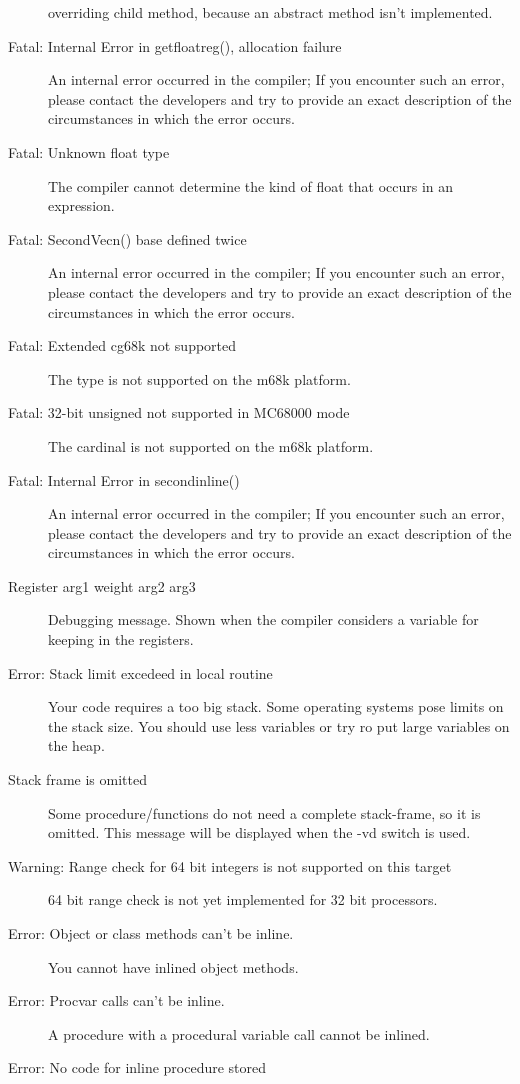 \begin{description}
 overriding child method, because an abstract method isn't implemented.
\item [Fatal: Internal Error in getfloatreg(), allocation failure]
 An internal error occurred in the compiler; If you encounter such an error,
 please contact the developers and try to provide  an exact description of
 the circumstances in which the error occurs.
\item [Fatal: Unknown float type]
 The compiler cannot determine the kind of float that occurs in an expression.
\item [Fatal: SecondVecn() base defined twice]
 An internal error occurred in the compiler; If you encounter such an error,
 please contact the developers and try to provide  an exact description of
 the circumstances in which the error occurs.
\item [Fatal: Extended cg68k not supported]
 The  type is not supported on the m68k platform.
\item [Fatal: 32-bit unsigned not supported in MC68000 mode]
 The cardinal is not supported on the m68k platform.
\item [Fatal: Internal Error in secondinline()]
 An internal error occurred in the compiler; If you encounter such an error,
 please contact the developers and try to provide  an exact description of
 the circumstances in which the error occurs.
\item [Register arg1 weight arg2 arg3]
 Debugging message. Shown when the compiler considers a variable for
 keeping in the registers.
\item [Error: Stack limit excedeed in local routine]
 Your code requires a too big stack. Some operating systems pose limits
 on the stack size. You should use less variables or try ro put large
 variables on the heap.
\item [Stack frame is omitted]
 Some procedure/functions do not need a complete stack-frame, so it is omitted.
 This message will be displayed when the {-vd} switch is used.
\item [Warning: Range check for 64 bit integers is not supported on this target]
 64 bit range check is not yet implemented for 32 bit processors.
\item [Error: Object or class methods can't be inline.]
 You cannot have inlined object methods.
\item [Error: Procvar calls can't be inline.]
 A procedure with a procedural variable call cannot be inlined.
\item [Error: No code for inline procedure stored]

\end{description}
